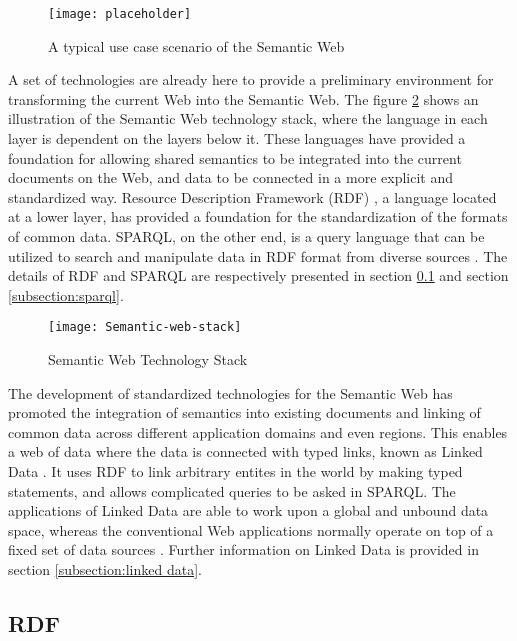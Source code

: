 \begin{figure}[h]
\centering
\texttt{[image: placeholder]}
\caption{A typical use case scenario of the Semantic Web}
\label{figure:usecase1}
\end{figure}

A set of technologies are already here to provide a preliminary environment for transforming the current Web into the Semantic Web. The figure \ref{figure:semantic web stack} shows an illustration of the Semantic Web technology stack, where the language in each layer is dependent on the layers below it. These languages have provided a foundation for allowing shared semantics to be integrated into the current documents on the Web, and data to be connected in a more explicit and standardized way. Resource Description Framework (RDF) \cite{Cyganiak2014}, a language located at a lower layer, has provided a foundation for the standardization of the formats of common data. SPARQL, on the other end, is a query language that can be utilized to search and manipulate data in RDF format from diverse sources \cite{Harris2013}. The details of RDF and SPARQL are respectively presented in section \ref{subsection:rdf} and section \ref{subsection:sparql}.

\begin{figure}[h]
\texttt{[image: Semantic-web-stack]}
\centering
\caption{Semantic Web Technology Stack}
\label{figure:semantic web stack}
\end{figure}

The development of standardized technologies for the Semantic Web has promoted the integration of semantics into existing documents and linking of common data across different application domains and even regions. This enables a web of data where the data is connected with typed links, known as Linked Data \cite{Bizer2009}. It uses RDF to link arbitrary entites in the world by making typed statements, and allows complicated queries to be asked in SPARQL. The applications of Linked Data are able to work upon a global and unbound data space, whereas the conventional Web applications normally operate on top of a fixed set of data sources \cite{Bizer2009}. Further information on Linked Data is provided in section \ref{subsection:linked data}.

\subsection{RDF} \label{subsection:rdf}



